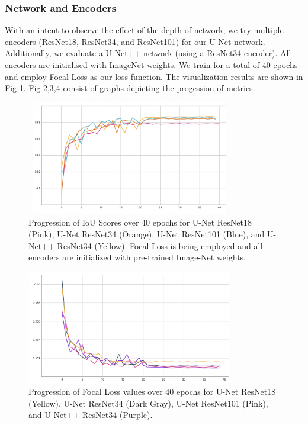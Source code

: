 \documentclass[conference]{IEEEtran}
\begin{document}
\subsubsection{Network and Encoders} With an intent to observe the effect of the depth of network, we try multiple encoders (ResNet18, ResNet34, and ResNet101) for our U-Net network. Additionally, we evaluate a U-Net++ network (using a ResNet34 encoder). All encoders are initialised with ImageNet weights. We train for a total of 40 epochs and employ Focal Loss as our loss function. The visualization results are shown in Fig 1. Fig 2,3,4 consist of graphs depicting the progession of metrics.

\begin{figure}[!h]
    \includegraphics[width=9cm, height=5cm]{images/encoders/encoders_iou.png}
    \caption{Progression of IoU Scores over 40 epochs for U-Net ResNet18 (Pink), U-Net ResNet34 (Orange), U-Net ResNet101 (Blue), and U-Net++ ResNet34 (Yellow). Focal Loss is being employed and all encoders are initialized with pre-trained Image-Net weights.}
\end{figure}



\begin{figure}[!h]
    \includegraphics[width=9cm, height=5cm]{images/encoders/encoders_focalloss.png}
    \caption{Progression of Focal Loss values over 40 epochs for U-Net ResNet18 (Yellow), U-Net ResNet34 (Dark Gray), U-Net ResNet101 (Pink), and U-Net++ ResNet34 (Purple).}
\end{figure}
\end{document}
